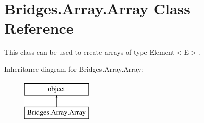 \hypertarget{class_bridges_1_1_array_1_1_array}{}\section{Bridges.\+Array.\+Array Class Reference}
\label{class_bridges_1_1_array_1_1_array}


This class can be used to create arrays of type Element$<$\+E$>$.  


Inheritance diagram for Bridges.\+Array.\+Array\+:\begin{figure}[H]
\begin{center}
\leavevmode
\includegraphics[height=2.000000cm]{class_bridges_1_1_array_1_1_array}
\end{center}
\end{figure}
